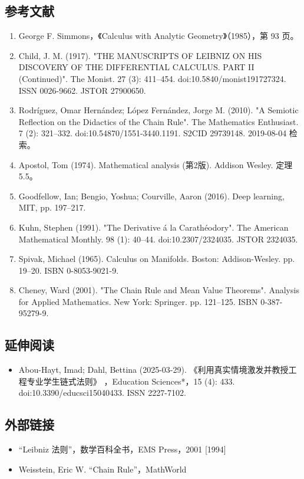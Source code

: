 \subsection{参考文献}
\begin{enumerate}
\item George F. Simmons，《Calculus with Analytic Geometry》（1985），第 93 页。
\item Child, J. M. (1917). "THE MANUSCRIPTS OF LEIBNIZ ON HIS DISCOVERY OF THE DIFFERENTIAL CALCULUS. PART II (Continued)". The Monist. 27 (3): 411–454. doi:10.5840/monist191727324. ISSN 0026-9662. JSTOR 27900650.
\item Rodríguez, Omar Hernández; López Fernández, Jorge M. (2010). "A Semiotic Reflection on the Didactics of the Chain Rule". The Mathematics Enthusiast. 7 (2): 321–332. doi:10.54870/1551-3440.1191. S2CID 29739148. 2019-08-04 检索。
\item Apostol, Tom (1974). Mathematical analysis (第2版). Addison Wesley. 定理 5.5。
\item Goodfellow, Ian; Bengio, Yoshua; Courville, Aaron (2016). Deep learning, MIT, pp. 197–217.
\item Kuhn, Stephen (1991). "The Derivative á la Carathéodory". The American Mathematical Monthly. 98 (1): 40–44. doi:10.2307/2324035. JSTOR 2324035.
\item Spivak, Michael (1965). Calculus on Manifolds. Boston: Addison-Wesley. pp. 19–20. ISBN 0-8053-9021-9.
\item Cheney, Ward (2001). "The Chain Rule and Mean Value Theorems". Analysis for Applied Mathematics. New York: Springer. pp. 121–125. ISBN 0-387-95279-9.
\end{enumerate}
\subsection{延伸阅读}
\begin{itemize}
\item Abou-Hayt, Imad; Dahl, Bettina (2025-03-29). 《利用真实情境激发并教授工程专业学生链式法则》 ，Education Sciences*，15 (4): 433. doi:10.3390/educsci15040433. ISSN 2227-7102.
\end{itemize}
\subsection{外部链接}
\begin{itemize}
\item “Leibniz 法则”，数学百科全书，EMS Press，2001 [1994]
\item Weisstein, Eric W. “Chain Rule”，MathWorld
\end{itemize}